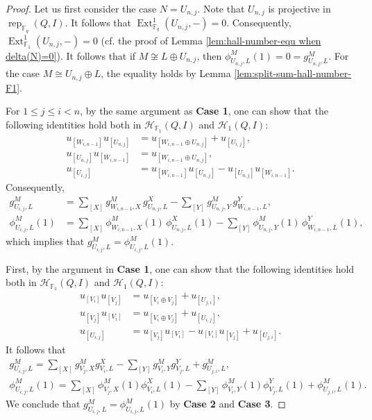 \documentclass[12pt]{amsart}
\theoremstyle{remark}
\theoremstyle{definition}
\numberwithin{equation}{section}
\newcommand{\Ext}{\operatorname{Ext}\nolimits}
\begin{document}
\begin{proof}
Let us first consider the case $N=U_{n,j}$. Note that $U_{n,j}$ is projective in $\operatorname{rep}_{\mathbb{F}_q}(Q,I)$. It follows that $\Ext^1_{\mathbb{F}_q}(U_{n,j},-)=0$. Consequently, $\Ext^1_{\mathbb{F}_1}(U_{n,j},-)=0$ (cf. the proof of Lemma \ref{lem:hall-number-equ when delta(N)=0}). It follows that if $M\not\cong L\oplus U_{n,j}$, then $\phi_{U_{n,j},L}^M(1)=0=g_{U_{n,j},L}^M$. For the case $M\cong U_{n,j}\oplus L$, the equality holds by Lemma \ref{lem:split-sum-hall-number-F1}.

For $1\leq j\leq i< n$, by the same argument as {\bf Case 1}, one can show that the following identities hold both in $\mathcal{H}_{\mathbb{F}_1}(Q,I)$ and $\mathcal{H}_1(Q,I)$:
\begin{align*}
u_{[W_{i,n-1}]}u_{[U_{n,j}]}
&=
u_{[W_{i,n-1}\oplus U_{n,j}]}+u_{[U_{i,j}]},\\
u_{[U_{n,j}]}u_{[W_{i,n-1}]}
&=
u_{[W_{i,n-1}\oplus U_{n,j}]},\\
u_{[U_{i,j}]}
&=
u_{[W_{i,n-1}]}u_{[U_{n,j}]}-u_{[U_{n,j}]}u_{[W_{i,n-1}]}.
\end{align*}
Consequently, 
\begin{align*}
    g^{M}_{U_{i,j},L}
&=
\sum_{[X]}g^{M}_{W_{i,n-1},X}\,g^{X}_{U_{n,j},L}
-
\sum_{[Y]}g^{M}_{U_{n,j},Y}\,g^{Y}_{W_{i,n-1},L},\\
 \phi^{M}_{U_{i,j},L}(1)
&=
\sum_{[X]}\phi^{M}_{W_{i,n-1},X}(1)\,\phi^{X}_{U_{n,j},L}(1)
-
\sum_{[Y]}\phi^{M}_{U_{n,j},Y}(1)\,\phi^{Y}_{W_{i,n-1},L}(1),
\end{align*}
which implies that $g_{U_{i,j},L}^M=\phi_{U_{i,j},L}^M(1)$.


First, by the argument in {\bf Case 1}, one can show that the following identities hold both in $\mathcal{H}_{\mathbb{F}_1}(Q,I)$ and $\mathcal{H}_1(Q,I)$:
\begin{align*}
    u_{[V_i]}u_{[V_j]}&= u_{[V_i\oplus V_j]} + u_{[U_{j,i}]},\\
    u_{[V_j]}u_{[V_i]}&= u_{[V_i\oplus V_j]} + u_{[U_{i,j}]},\\
    u_{[U_{i,j}]}&= u_{[V_j]}u_{[V_i]}- u_{[V_i]}u_{[V_j]}+ u_{[U_{j,i}]}. 
\end{align*}
It follows that 
\begin{align*}
g^{M}_{U_{i,j},L}
=
\sum_{[X]}g^{M}_{V_j,X}g^{X}_{V_i,L}
-
\sum_{[Y]}g^{M}_{V_i,Y}g^{Y}_{V_j,L}
+
 g^{M}_{U_{j,i},L},\\
 \phi^{M}_{U_{i,j},L}(1)
=
\sum_{[X]}\phi^{M}_{V_j,X}(1)\phi^{X}_{V_i,L}(1)
-
\sum_{[Y]}\phi^{M}_{V_i,Y}(1)\phi^{Y}_{V_j,L}(1)
+
 \phi^{M}_{U_{j,i},L}(1).
\end{align*}
We conclude that $g_{U_{i,j},L}^M=\phi_{U_{i,j},L}^M(1)$ by {\bf Case 2} and {\bf Case 3}.


\end{proof}
\end{document}
